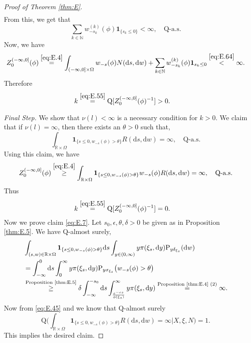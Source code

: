 \documentclass[12pt,a4paper]{amsart}
\numberwithin{equation}{section}
\theoremstyle{plain}
\theoremstyle{definition}
\theoremstyle{remark}
\begin{document}
\begin{proof}[Proof of Theorem \ref{thm:E}]
\begin{align}
\end{align}
	From this, we get that
\begin{equation}
	\sum_{k\in \mathbb N} w^{(k)}_{-s_k}(\phi) \mathbf 1_{\{s_k \leq 0\}}< \infty, \quad \mathrm Q\text{-a.s.}
\end{equation}
	Now, we have
\begin{equation}
	Z_0^{(-\infty, 0]}(\phi) \overset{\eqref{eq:E.4}}= \int_{(-\infty,0]\times \Omega}w_{-s}(\phi) N({\mathrm d}s, {\mathrm d}w) + \sum_{k\in \mathbb N} w^{(k)}_{-s_k}(\phi) \mathbf 1_{s_k \leq 0}
	\overset{\eqref{eq:E.64}} < \infty.
\end{equation}
	Therefore
\begin{align}
	& k \overset{\eqref{eq:E.55}}= \mathrm Q[Z^{(-\infty,0]}_0(\phi)^{-1}] > 0.
\end{align}

\emph{Final Step.} We show that $\nu(l)<\infty$ is a necessary condition for $k>0$.
	We claim that if $\nu(l) = \infty$, then there exists an $\theta>0$ such that,
\begin{equation} \label{eq:E.7}
	\int_{\mathbb R\times \Omega}\mathbf 1_{\{s\leq 0, w_{-s}(\phi)>\theta\}} R(\mathrm ds,\mathrm dw)
	= \infty,
	\quad \mathrm Q\text{-a.s.}
\end{equation}
	Using this claim, we have
\begin{equation}
	Z_0^{(-\infty, 0]}(\phi)
	\overset{\eqref{eq:E.4}} \geq \int_{\mathbb R\times \Omega} \mathbf 1_{\{s\leq 0, w_{-s}(\phi)>\theta\}} w_{-s}(\phi) R(\mathrm ds,\mathrm dw)
	= \infty,
	\quad \mathrm Q\text{-a.s.}
\end{equation}
	Thus
\begin{align}
	& k \overset{\eqref{eq:E.55}}= \mathrm Q[Z^{(-\infty,0]}_0(\phi)^{-1}] = 0.
\end{align}
	Now we prove claim \eqref{eq:E.7}.
	Let $s_0, \epsilon, \theta, \delta > 0$ be given as in Proposition \ref{thm:E.5}.
	We have $\mathrm Q$-almost surely,
\begin{align}
	  & \int_{(s,w)\in \mathbb R\times \Omega} \mathbf 1_{\{s\leq 0, w_{-s}(\phi)> \theta\}}
	  \mathrm ds  \int_{y\in (0,\infty)} y \pi(\xi_s, \mathrm dy) \mathrm P_{y\delta_{\xi_s}}(\mathrm dw)
	\\&= \int_{-\infty}^0 \mathrm ds \int_0^\infty  y \pi(\xi_s, \mathrm dy) \mathrm P_{y \sigma_{\xi_s}}\big(w_{-s}(\phi)>\theta\big)
	\\&\overset{\text{Proposition \ref{thm:E.5}}}\geq \delta \int_{-\infty}^{-s_0} \mathrm ds
 \int_{\frac{e^{-\epsilon s}}{\phi(\xi_s)}}^\infty  y \pi(\xi_s, \mathrm dy)
  	\overset{\text{Proposition \ref{thm:E.4} (2)}}= \infty.
\end{align}
	Now from \eqref{eq:E.45} and \cite[Theorem 2.7(i)]{Kyprianou2014Fluctuations} we know that $\mathrm Q$-almost surely
\begin{equation}
	\mathrm Q \Big(\int_{\mathbb R\times \Omega}\mathbf 1_{\{s\leq 0, w_{-s}(\phi)>\theta\}} R(\mathrm ds,\mathrm dw)
	= \infty\Big| X, \xi, N\Big)  = 1.
\end{equation}
	This implies the desired claim.
\end{proof}
\end{document}
